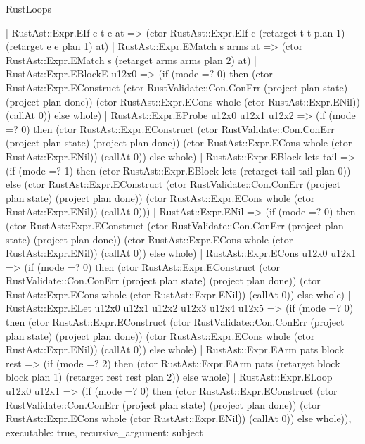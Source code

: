 \begin{lexlean}{RustLoops}
\begin{semanticmodule}
{    | RustAst::Expr.EIf c t e at => (ctor RustAst::Expr.EIf c (retarget t t plan 1) (retarget e e plan 1) at)
    | RustAst::Expr.EMatch s arms at => (ctor RustAst::Expr.EMatch s (retarget arms arms plan 2) at)
    | RustAst::Expr.EBlockE u12x0 => (if (mode =? 0) then (ctor RustAst::Expr.EConstruct (ctor RustValidate::Con.ConErr (project plan state) (project plan done)) (ctor RustAst::Expr.ECons whole (ctor RustAst::Expr.ENil)) (callAt 0)) else whole)
    | RustAst::Expr.EProbe u12x0 u12x1 u12x2 => (if (mode =? 0) then (ctor RustAst::Expr.EConstruct (ctor RustValidate::Con.ConErr (project plan state) (project plan done)) (ctor RustAst::Expr.ECons whole (ctor RustAst::Expr.ENil)) (callAt 0)) else whole)
    | RustAst::Expr.EBlock lets tail => (if (mode =? 1) then (ctor RustAst::Expr.EBlock lets (retarget tail tail plan 0)) else (ctor RustAst::Expr.EConstruct (ctor RustValidate::Con.ConErr (project plan state) (project plan done)) (ctor RustAst::Expr.ECons whole (ctor RustAst::Expr.ENil)) (callAt 0)))
    | RustAst::Expr.ENil => (if (mode =? 0) then (ctor RustAst::Expr.EConstruct (ctor RustValidate::Con.ConErr (project plan state) (project plan done)) (ctor RustAst::Expr.ECons whole (ctor RustAst::Expr.ENil)) (callAt 0)) else whole)
    | RustAst::Expr.ECons u12x0 u12x1 => (if (mode =? 0) then (ctor RustAst::Expr.EConstruct (ctor RustValidate::Con.ConErr (project plan state) (project plan done)) (ctor RustAst::Expr.ECons whole (ctor RustAst::Expr.ENil)) (callAt 0)) else whole)
    | RustAst::Expr.ELet u12x0 u12x1 u12x2 u12x3 u12x4 u12x5 => (if (mode =? 0) then (ctor RustAst::Expr.EConstruct (ctor RustValidate::Con.ConErr (project plan state) (project plan done)) (ctor RustAst::Expr.ECons whole (ctor RustAst::Expr.ENil)) (callAt 0)) else whole)
    | RustAst::Expr.EArm pats block rest => (if (mode =? 2) then (ctor RustAst::Expr.EArm pats (retarget block block plan 1) (retarget rest rest plan 2)) else whole)
    | RustAst::Expr.ELoop u12x0 u12x1 => (if (mode =? 0) then (ctor RustAst::Expr.EConstruct (ctor RustValidate::Con.ConErr (project plan state) (project plan done)) (ctor RustAst::Expr.ECons whole (ctor RustAst::Expr.ENil)) (callAt 0)) else whole)),
  executable: true,
  recursive_argument: subject
}


\end{semanticmodule}
\end{lexlean}
